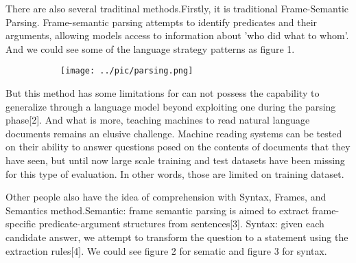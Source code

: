 \documentclass[runningheads,a4paper]{llncs}
\begin{document}
There are also several traditinal methods.Firstly, it is traditional Frame-Semantic Parsing. Frame-semantic parsing attempts to identify predicates and their arguments, allowing models access to information about 'who did what to whom'. And we could see some of the language strategy patterns as figure 1.

\begin{figure}[p]
	\centering
	\begin{subfigure}{.5\textwidth}
		\centering
		\texttt{[image: ../pic/parsing.png]}
		
		\label{figure 1:Frame-Semantic Parsing}
	\end{subfigure}	
\end{figure}




	



But this method has some limitations for can not possess the capability to generalize through a language model beyond exploiting one during the parsing phase[2]. And what is more, teaching machines to read natural language documents remains an elusive challenge. Machine reading systems can be tested on their ability to answer questions posed on the contents of documents that they have seen, but until now large scale training and test datasets have been missing for this type of evaluation. In other words, those are limited on training dataset.

Other people also have the idea of comprehension with Syntax, Frames, and Semantics method.Semantic: frame semantic parsing is aimed to extract frame-specific predicate-argument structures from sentences[3].
Syntax: given each candidate answer, we attempt to transform the question to a statement using the extraction rules[4]. We could see figure 2 for sematic and figure 3 for syntax.
	
\end{document}
